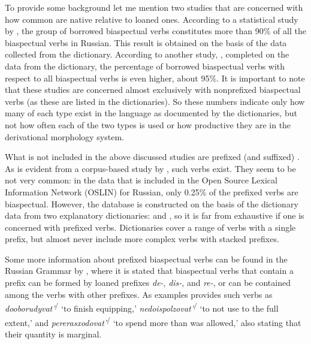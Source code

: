 To provide some background let me mention two studies that are concerned with how common are native  relative to loaned  ones. According to a statistical study by \citet{Certkova:98}, the group of borrowed biaspectual verbs constitutes more than 90\% of all the biaspectual verbs in Russian. This result is obtained on the basis of the data collected from the \citealt{Ozegov:90} dictionary. According to another study, \citealt{Anderson:02}, completed on the data from the \citealt{Zaliznjak:77} dictionary, the percentage of borrowed biaspectual verbs with respect to all biaspectual verbs is even higher, about 95\%. It is important to note that these studies are concerned almost exclusively with nonprefixed biaspectual verbs (as these are listed in the dictionaries). So these numbers indicate only how many  of each type exist in the language as documented by the dictionaries, but not how often each of the two types is used or how productive they are in the derivational morphology system.

What is not included in the above discussed studies are prefixed (and suffixed) . As is evident from a corpus-based study by \citet{Borik:12}, such verbs exist. They seem to be not very common: in the data that is included in the Open Source Lexical Information Network (OSLIN) for Russian, only 0.25\% of the prefixed verbs are biaspectual. However, the database is constructed on the basis of the dictionary data from two explanatory dictionaries: \citealt{Ushakov:50} and \citealt{OzegovShvedova:92}, so it is far from exhaustive if one is concerned with prefixed verbs. Dictionaries cover a range of verbs with a single prefix, but almost never include more complex verbs with stacked prefixes. 

Some more information about prefixed biaspectual verbs  can be found in the Russian Grammar by \citet{Shvedova:82}, where it is stated that biaspectual verbs that contain a prefix can be formed by loaned prefixes \textit {de-}, \textit {dis-}, and \textit{re-}, or can be contained among the verbs with other prefixes. As examples \citet{Shvedova:82} provides such verbs as  \textit{dooborudyvat'}\textsuperscript{\IPF\slash\PF} `to finish equipping,' \textit{nedoispolzovat'}\textsuperscript{\IPF\slash\PF} `to not use to the full extent,' and \textit{pererasxodovat'}\textsuperscript{\IPF\slash\PF} `to spend more than was allowed,' also stating that their quantity is marginal. 

